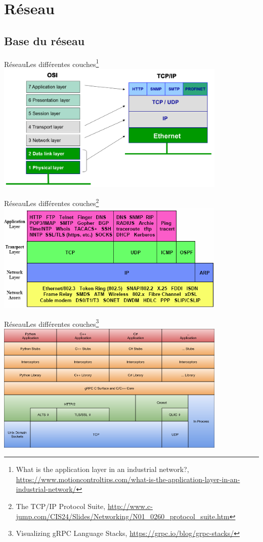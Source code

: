 \documentclass{beamer}
\begin{document}
    \section{Réseau}\label{sec:network}

    \subsection{Base du réseau}\label{subsec:basic-network}

    \begin{frame}{Réseau}{Les différentes couches\footnote{What is the application layer in an industrial network?, \url{https://www.motioncontroltips.com/what-is-the-application-layer-in-an-industrial-network/}}}
        \centering
        \includegraphics[width=11cm]{image/OSI-vs-TCPIP-Layers}
    \end{frame}

    \begin{frame}{Réseau}{Les différentes couches\footnote{The TCP/IP Protocol Suite, \url{http://www.c-jump.com/CIS24/Slides/Networking/N01_0260_protocol_suite.htm}}}
        \centering
        \includegraphics[width=11cm]{image/tcp_ip_suite}
    \end{frame}

    \begin{frame}{Réseau}{Les différentes couches\footnote{Visualizing gRPC Language Stacks, \url{https://grpc.io/blog/grpc-stacks/}}}
        \centering
        \includegraphics[width=11cm]{image/grpc-core-stack}
    \end{frame}
\end{document}
